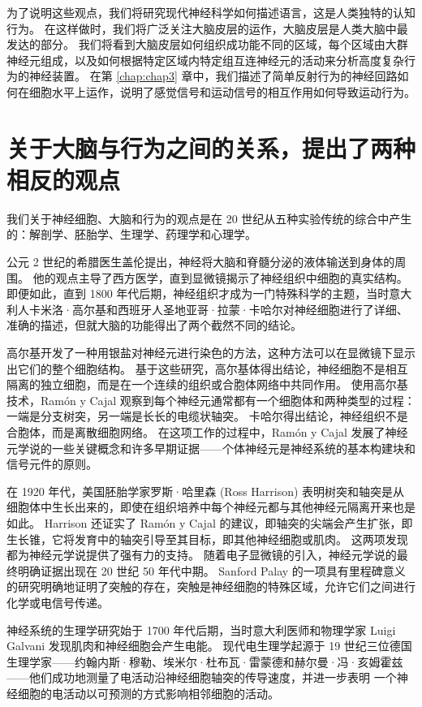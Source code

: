 为了说明这些观点，我们将研究现代神经科学如何描述语言，这是人类独特的认知行为。 
在这样做时，我们将广泛关注大脑皮层的运作，大脑皮层是人类大脑中最发达的部分。 
我们将看到大脑皮层如何组织成功能不同的区域，每个区域由大群神经元组成，以及如何根据特定区域内特定组互连神经元的活动来分析高度复杂行为的神经装置。 
在第 \ref{chap:chap3} 章中，我们描述了简单反射行为的神经回路如何在细胞水平上运作，说明了感觉信号和运动信号的相互作用如何导致运动行为。



\section{关于大脑与行为之间的关系，提出了两种相反的观点}

我们关于神经细胞、大脑和行为的观点是在 20 世纪从五种实验传统的综合中产生的：解剖学、胚胎学、生理学、药理学和心理学。


公元 2 世纪的希腊医生盖伦提出，神经将大脑和脊髓分泌的液体输送到身体的周围。
他的观点主导了西方医学，直到显微镜揭示了神经组织中细胞的真实结构。
即便如此，直到 1800 年代后期，神经组织才成为一门特殊科学的主题，当时意大利人卡米洛·高尔基和西班牙人圣地亚哥·拉蒙·卡哈尔对神经细胞进行了详细、准确的描述，但就大脑的功能得出了两个截然不同的结论。


高尔基开发了一种用银盐对神经元进行染色的方法，这种方法可以在显微镜下显示出它们的整个细胞结构。 
基于这些研究，高尔基体得出结论，神经细胞不是相互隔离的独立细胞，而是在一个连续的组织或合胞体网络中共同作用。 
使用高尔基技术，Ramón y Cajal 观察到每个神经元通常都有一个细胞体和两种类型的过程：一端是分支树突，另一端是长长的电缆状轴突。 
卡哈尔得出结论，神经组织不是合胞体，而是离散细胞网络。 
在这项工作的过程中，Ramón y Cajal 发展了神经元学说的一些关键概念和许多早期证据——个体神经元是神经系统的基本构建块和信号元件的原则。


在 1920 年代，美国胚胎学家罗斯·哈里森 (Ross Harrison) 表明树突和轴突是从细胞体中生长出来的，即使在组织培养中每个神经元都与其他神经元隔离开来也是如此。 
Harrison 还证实了 Ramón y Cajal 的建议，即轴突的尖端会产生扩张，即生长锥，它将发育中的轴突引导至其目标，即其他神经细胞或肌肉。 
这两项发现都为神经元学说提供了强有力的支持。 
随着电子显微镜的引入，神经元学说的最终明确证据出现在 20 世纪 50 年代中期。 
Sanford Palay 的一项具有里程碑意义的研究明确地证明了突触的存在，突触是神经细胞的特殊区域，允许它们之间进行化学或电信号传递。


神经系统的生理学研究始于 1700 年代后期，当时意大利医师和物理学家 Luigi Galvani 发现肌肉和神经细胞会产生电能。 
现代电生理学起源于 19 世纪三位德国生理学家——约翰内斯·穆勒、埃米尔·杜布瓦·雷蒙德和赫尔曼·冯·亥姆霍兹——他们成功地测量了电活动沿神经细胞轴突的传导速度，并进一步表明 一个神经细胞的电活动以可预测的方式影响相邻细胞的活动。


